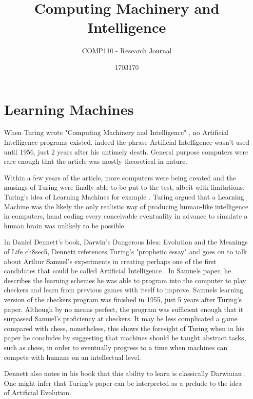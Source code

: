 \documentclass{scrartcl}
\title{Computing Machinery and Intelligence
}
\subtitle{COMP110 - Research Journal}
\author{1703170}
\begin{document}
\maketitle


\section{Learning Machines}


When Turing wrote "Computing Machinery and Intelligence" \cite{turing1950computing:1}, no Artificial Intelligence programs existed, indeed the phrase Artificial Intelligence wasn't used until 1956, just 2 years after his untimely death. General purpose computers were rare enough that the article was mostly theoretical in nature. \par
Within a few years of the article, more computers were being created and the musings of Turing were finally able to be put to the test, albeit with limitations. Turing's idea of Learning Machines for example \cite{ramscar2010computing:2}. Turing argued that a Learning Machine was the likely the only realistic way of producing human-like intelligence in computers, hand coding every conceivable eventuality in advance to simulate a human brain was unlikely to be possible. \par
In Daniel Dennett's book, Darwin's Dangerous Idea: Evolution and the Meanings of Life \cite{dennett1996darwin:3}ch8sec5, Dennett references Turing's "prophetic essay" and goes on to talk about Arthur Samuel's experiments in creating perhaps one of the first candidates that could be called Artificial Intelligence \cite{samuel2000some:4}. In Samuels paper, he describes the learning schemes he was able to program into the computer to play checkers and learn from previous games with itself to improve. Samuels learning version of the checkers program was finished in 1955, just 5 years after Turing's paper. Although by no means perfect, the program was sufficient enough that it surpassed Samuel's proficiency at checkers. It may be less complicated a game compared with chess, nonetheless, this shows the foresight of Turing when in his paper he concludes by suggesting that machines should be taught abstract tasks, such as chess, in order to eventually progress to a time when machines can compete with humans on an intellectual level. \par
Dennett also notes in his book that this ability to learn is classically Darwinian \cite{darwin2009origin:5}. One might infer that Turing's paper can be interpreted as a prelude to the idea of Artificial Evolution.
\end{document}
